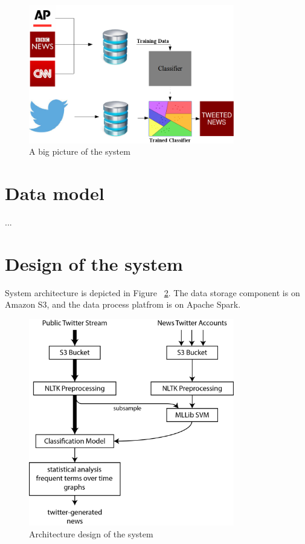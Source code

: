 \documentclass{llncs}
\begin{document}
\begin{figure}[H]
	\centering
	\includegraphics[width=0.8\textwidth]{images/bigpicture.png} 
	\caption{A big picture of the system}
	\label{fig:A big picture of the system}
\end{figure}



\section{Data model}
...


\section{Design of the system}
System architecture is depicted in Figure ~\ref{fig:Architecture design of the system}. The data storage component is on Amazon S3, and the data process platfrom is on Apache Spark. 

\begin{figure}[H]
	\centering
	\includegraphics[width=0.8\textwidth]{images/system_arch.png} 
	\caption{Architecture design of the system}
	\label{fig:Architecture design of the system}
\end{figure}
\end{document}
